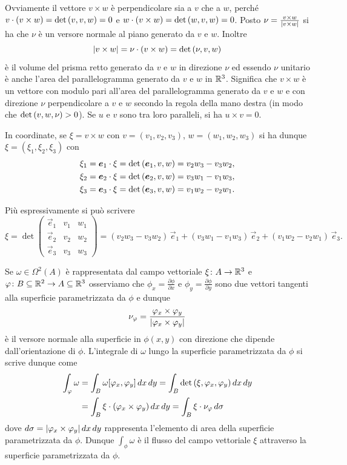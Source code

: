 Ovviamente il vettore $v\times w$ è perpendicolare sia a $v$ che a $w$,
perché $v\cdot (v\times w) = \det{\left( v,v,w \right)} = 0$ e $w\cdot (v\times w) = \det{\left( w,v,w \right)} = 0$.
Posto $\nu = \frac{v\times w}{{\left|v\times w\right|}}$ si ha che $\nu$ è un versore normale al piano
generato da $v$ e $w$.
Inoltre 
\[ 
{\left|v\times w\right|} = \nu\cdot(v\times w) = \det{\left( \nu, v, w \right)}
\]
è il volume del prisma retto generato da $v$ e $w$ in direzione $\nu$
ed essendo $\nu$ unitario è anche l'area del parallelogramma generato da $v$ e $w$ in ${\mathbb R}^3$.
Significa che $v\times w$ è un vettore con modulo pari all'area del parallelogramma generato da $v$ e $w$ 
e con direzione $\nu$ perpendicolare a $v$ e $w$ secondo la regola della mano destra
(in modo che $\det {\left( v, w, \nu \right)} > 0$).
Se $u$ e $v$ sono tra loro paralleli, si ha $u\times v = 0$.

In coordinate, se $\xi = v\times w$ con $v=(v_1,v_2,v_3)$, $w=(w_1,w_2,w_3)$
si ha dunque $\xi=(\xi_1,\xi_2,\xi_3)$ 
con
\begin{align*}
  \xi_1 &= \boldsymbol e_1 \cdot \xi = \det{\left( \boldsymbol e_1,v,w \right)} = v_2 w_3 - v_3 w_2,\\ 
  \xi_2 &= \boldsymbol e_2 \cdot \xi = \det{\left( \boldsymbol e_2,v,w \right)} = v_3 w_1 - v_1 w_3,\\
  \xi_3 &= \boldsymbol e_3 \cdot \xi = \det{\left( \boldsymbol e_3,v,w \right)} = v_1 w_2 - v_2 w_1.
\end{align*}

Più espressivamente si può scrivere
\[
  \xi = \det\begin{pmatrix}
    \vec e_1 & v_1 & w_1 \\ \vec e_2 & v_2 & w_2 \\ \vec e_3 & v_3 & w_3
  \end{pmatrix}
  = (v_2 w_3 - v_3 w_2)\, \vec e_1 + (v_3 w_1 - v_1 w_3)\,  \vec e_2 + (v_1 w_2 - v_2 w_1)\, \vec e_3. 
\]

Se $\omega\in \Omega^2(A)$ è rappresentata dal campo vettoriale 
$\xi\colon A\to {\mathbb R}^3$ 
e $\varphi\colon B\subseteq {\mathbb R}^2\to A \subseteq {\mathbb R}^3$ 
osserviamo che $\phi_x = \frac{\partial \phi}{\partial x}$ e $\phi_y = \frac{\partial \phi}{\partial y}$ 
sono due vettori tangenti alla superficie parametrizzata da $\phi$ e dunque 
\[
  \nu_\varphi = \frac{\varphi_x \times \varphi_y}{{\left|\varphi_x \times \varphi_y\right|}}
\]
è il versore normale alla superficie in $\phi(x,y)$ 
con direzione che dipende dall'orientazione di $\phi$.
L'integrale di $\omega$ lungo la superficie parametrizzata da $\phi$ si 
scrive dunque come
\begin{align*}
 \int_{\varphi} \omega
 &= \int_B \omega {\left[ \varphi_x, \varphi_y \right]}\, dx\, dy
 = \int_B \det {\left( \xi, \varphi_x, \varphi_y \right)}\, dx\, dy\\
 &= \int_B \xi \cdot {\left( \varphi_x \times \varphi_y \right)}\, dx\, dy
 = \int_B \xi \cdot \nu_\varphi\, d\sigma
\end{align*}
dove $d\sigma = {\left|\varphi_x \times \varphi_y\right|}\, dx\, dy$ 
rappresenta l'elemento di area della superficie parametrizzata da $\phi$.
Dunque $\int_\phi \omega$ è il flusso del campo vettoriale $\xi$ 
attraverso la superficie parametrizzata da $\phi$.

